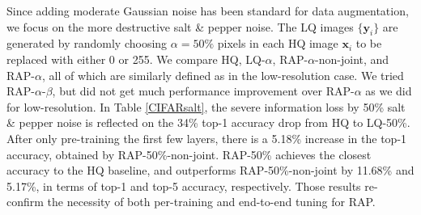 \documentclass[10pt,twocolumn,twoside]{IEEEtran} %
\begin{document}
Since adding moderate Gaussian noise has been standard for data augmentation, we focus on the more destructive salt \& pepper noise. The LQ images $\{\mathbf{y}_i\}$ are generated by randomly choosing $\alpha = 50\%$ pixels in each HQ image $\mathbf{x}_i$ to be replaced with either 0 or 255. We compare HQ, LQ-$\alpha$, RAP-$\alpha$-non-joint, and RAP-$\alpha$, all of which are similarly defined as in the low-resolution case. We tried RAP-$\alpha$-$\beta$, but did not get much performance improvement over RAP-$\alpha$ as we did for low-resolution. In Table \ref{CIFARsalt}, the severe information loss by 50\% salt \& pepper noise is reflected on the 34\% top-1 accuracy drop from HQ to LQ-50\%. After only pre-training the first few layers, there is a 5.18\% increase in the top-1 accuracy, obtained by RAP-50\%-non-joint. RAP-50\% achieves the closest accuracy to the HQ baseline, and outperforms RAP-50\%-non-joint by 11.68\% and 5.17\%, in terms of top-1 and top-5 accuracy, respectively. Those results re-confirm the necessity of both per-training and end-to-end tuning for RAP.
\end{document}
